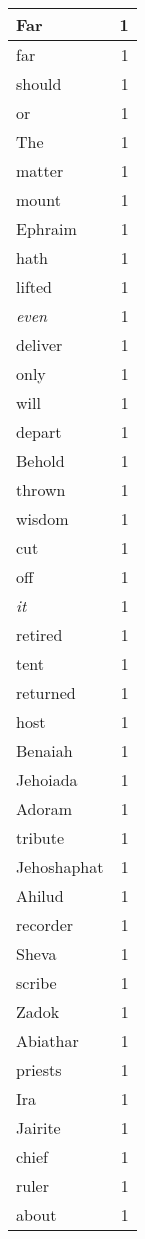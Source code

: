\begin{center}
\begin{longtable}{l|r}
Far & 1 \\ \hline
far & 1 \\ \hline
should & 1 \\ \hline
or & 1 \\ \hline
The & 1 \\ \hline
matter & 1 \\ \hline
mount & 1 \\ \hline
Ephraim & 1 \\ \hline
hath & 1 \\ \hline
lifted & 1 \\ \hline
\emph{even} & 1 \\ \hline
deliver & 1 \\ \hline
only & 1 \\ \hline
will & 1 \\ \hline
depart & 1 \\ \hline
Behold & 1 \\ \hline
thrown & 1 \\ \hline
wisdom & 1 \\ \hline
cut & 1 \\ \hline
off & 1 \\ \hline
\emph{it} & 1 \\ \hline
retired & 1 \\ \hline
tent & 1 \\ \hline
returned & 1 \\ \hline
host & 1 \\ \hline
Benaiah & 1 \\ \hline
Jehoiada & 1 \\ \hline
Adoram & 1 \\ \hline
tribute & 1 \\ \hline
Jehoshaphat & 1 \\ \hline
Ahilud & 1 \\ \hline
recorder & 1 \\ \hline
Sheva & 1 \\ \hline
scribe & 1 \\ \hline
Zadok & 1 \\ \hline
Abiathar & 1 \\ \hline
priests & 1 \\ \hline
Ira & 1 \\ \hline
Jairite & 1 \\ \hline
chief & 1 \\ \hline
ruler & 1 \\ \hline
about & 1 \\ \hline
\end{longtable}
\end{center}



